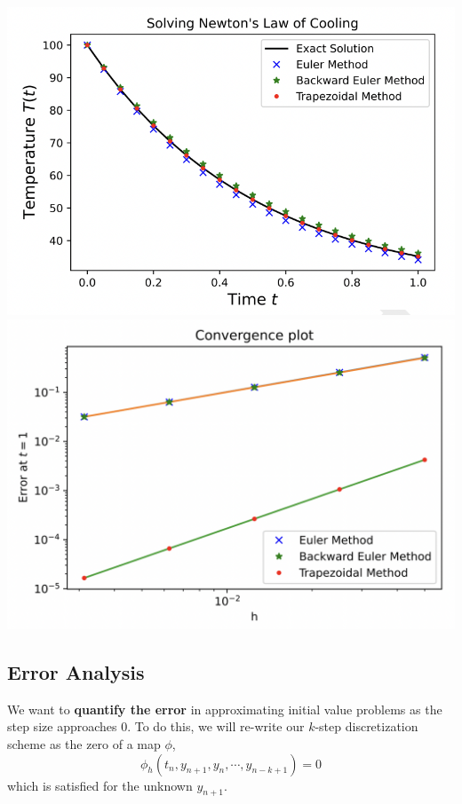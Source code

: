\begin{marginfigure}
	\begin{center}
       \includegraphics[width=\textwidth]{figures/fig-25.png}
       \includegraphics[width=\textwidth]{figures/fig-26.png}
	\end{center}
\end{marginfigure}

\subsection{Error Analysis}
We want to \textbf{quantify the error} in approximating initial value problems as the step size approaches $0$. To do this, we will re-write our $k$-step discretization scheme as the zero of a map $\phi$,
\[\phi_h(t_n, y_{n+1}, y_n, \cdots, y_{n-k+1}) = 0\]
which is satisfied for the unknown $y_{n+1}$.

